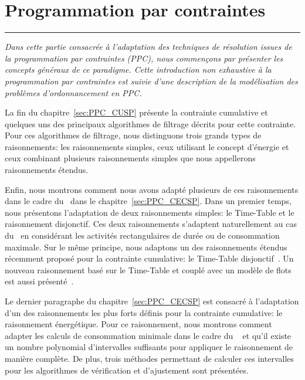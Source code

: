 

\cleardoublepage
\begin{minipage}{0.95\linewidth}
\part{Programmation par contraintes}
\label{part:PPC}
\vspace{15mm} %
\parttoc 
\end{minipage}

\newpage
\thispagestyle{empty}
\begin{center}
  \begin{minipage}{\textwidth}
    \hrule
    \vspace{0.5cm}
    {\it Dans cette partie consacrée à l'adaptation des techniques de
      résolution issues de la programmation par contraintes (PPC), nous
      commençons par présenter les concepts généraux de ce
      paradigme. Cette introduction non exhaustive à la programmation
      par contraintes est suivie d'une description de la modélisation
      des problèmes d'ordonnancement en PPC. 

      La fin du chapitre~\ref{sec:PPC_CUSP} présente la contrainte
      cumulative et quelques uns des principaux algorithmes de filtrage décrits
      pour cette contrainte. Pour ces algorithmes de filtrage, nous
      distinguons trois grands types de raisonnements: les
      raisonnements simples, ceux utilisant le concept d'énergie et
      ceux combinant plusieurs raisonnements simples que nous
      appellerons raisonnements étendus. 
    
      Enfin, nous montrons comment nous avons adapté plusieurs de ces
      raisonnements dans le cadre du \CECSP~dans le
      chapitre~\ref{sec:PPC_CECSP}. Dans un premier temps, nous présentons
      l'adaptation de deux raisonnements simples: le Time-Table et le
      raisonnement disjonctif. Ces deux raisonnements s'adaptent 
      naturellement au cas du \CECSP~en considérant les activités
      rectangulaires de durée ou de consommation
      maximale. Sur le même principe, nous adaptons un des
      raisonnements étendus récemment proposé pour la contrainte cumulative: le 
      Time-Table disjonctif~\cite{Gay2015}. Un nouveau raisonnement
      basé sur le Time-Table et couplé avec un modèle de flots est
      aussi présenté~\cite{Nattaf_CPDP}.

      Le dernier paragraphe du chapitre~\ref{sec:PPC_CECSP} est
      consacré à l'adaptation d'un des raisonnements les plus forts définis pour la
      contrainte cumulative: le raisonnement énergétique. Pour ce
      raisonnement, nous montrons comment adapter les calculs de
      consommation minimale dans le cadre du \CECSP~ et qu'il existe
      un nombre polynomial d'intervalles suffisants pour appliquer le
      raisonnement de manière complète. De plus, trois 
      méthodes permettant de calculer ces intervalles pour les algorithmes de
      vérification et d'ajustement sont présentées. 

}
\end{minipage}
\end{center}

